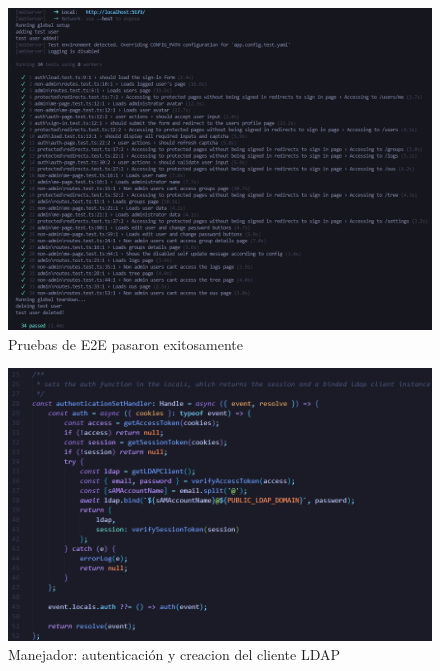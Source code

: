 \begin{figure}[H]
    \centering
    \includegraphics[width=\linewidth]{images/playwright tests run successfully.png}
    \caption{Pruebas de E2E pasaron exitosamente}
    \label{fig:e2e-test-run-ok}
\end{figure}


\begin{figure}[H]
    \centering
    \includegraphics[width=\textwidth]{images/code/authenticationSetHandler.png}
    \caption{Manejador: autenticación y creacion del cliente LDAP}
    \label{fig:authentication-set-handler}
\end{figure}

